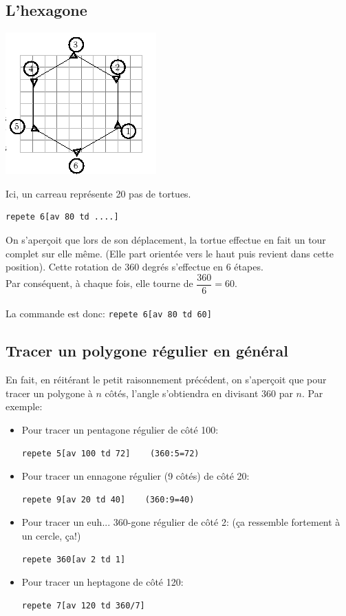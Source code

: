 \subsection{L'hexagone}
\begin{center}
\includegraphics{images/bases-hexagone.png}
\end{center}
\noindent Ici, un carreau représente 20 pas de tortues.\\
\begin{verbatim}
repete 6[av 80 td ....]
\end{verbatim}
On s'aperçoit que lors de son déplacement, la tortue effectue en fait un tour complet sur elle même. (Elle part orientée vers le haut puis revient dans cette position). Cette rotation de 360 degrés s'effectue en 6 étapes.\\
 Par conséquent, à chaque fois, elle tourne de $\dfrac{360}{6}=60$\degre. \\ \\
La commande est donc: \texttt{repete 6[av 80 td 60]}

\subsection{Tracer un polygone régulier en général}
\noindent En fait, en réitérant le petit raisonnement précédent, on s'aperçoit que pour tracer un polygone à $n$ côtés, l'angle s'obtiendra en divisant 360 par $n$. Par exemple:\begin{itemize}
\item Pour tracer un pentagone régulier de côté 100:
\begin{verbatim}
repete 5[av 100 td 72]    (360:5=72)
\end{verbatim}
\item Pour tracer un ennagone régulier (9 côtés) de côté 20:
\begin{verbatim}
repete 9[av 20 td 40]    (360:9=40)
\end{verbatim}
\item Pour tracer un euh... 360-gone régulier de côté 2: (ça ressemble fortement à un cercle, ça!)
\begin{verbatim}
repete 360[av 2 td 1]  
\end{verbatim}
\item Pour tracer un heptagone de côté 120:
\begin{verbatim}
repete 7[av 120 td 360/7]
\end{verbatim}
\end{itemize}


